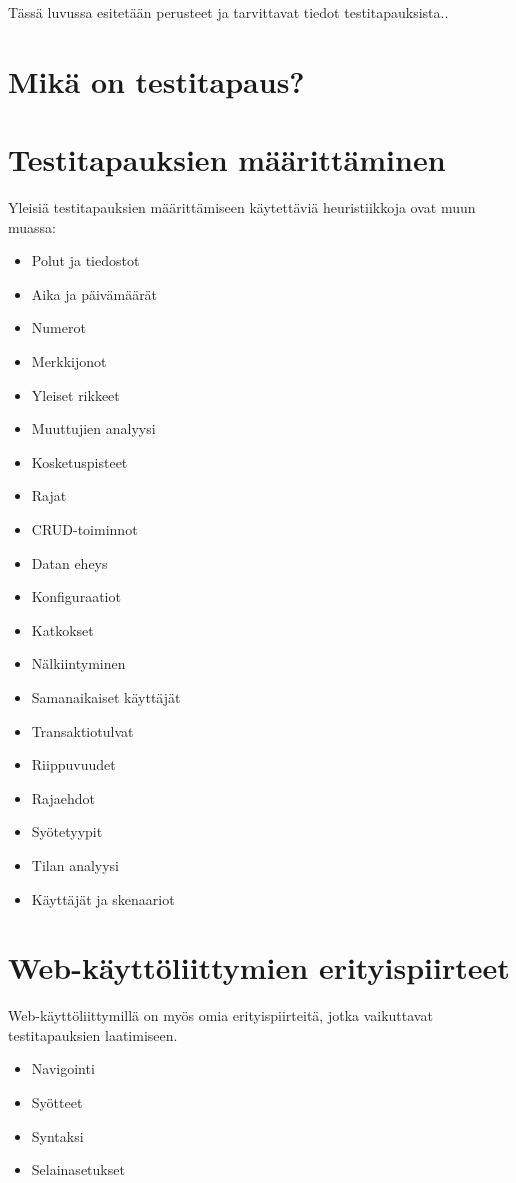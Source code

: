 Tässä luvussa esitetään perusteet ja tarvittavat tiedot testitapauksista..

\section{Mikä on testitapaus?}


\section{Testitapauksien määrittäminen}

Yleisiä testitapauksien määrittämiseen käytettäviä heuristiikkoja ovat muun muassa:
\begin{itemize}
  \item Polut ja tiedostot
  \item Aika ja päivämäärät
  \item Numerot
  \item Merkkijonot
  \item Yleiset rikkeet
  \item Muuttujien analyysi
  \item Kosketuspisteet
  \item Rajat
  \item CRUD-toiminnot
  \item Datan eheys
  \item Konfiguraatiot
  \item Katkokset
  \item Nälkiintyminen
  \item Samanaikaiset käyttäjät
  \item Transaktiotulvat
  \item Riippuvuudet
  \item Rajaehdot
  \item Syötetyypit
  \item Tilan analyysi
  \item Käyttäjät ja skenaariot
\end{itemize}

\section{Web-käyttöliittymien erityispiirteet}

Web-käyttöliittymillä on myös omia erityispiirteitä, jotka vaikuttavat testitapauksien laatimiseen.
\begin{itemize}
  \item Navigointi
  \item Syötteet
  \item Syntaksi
  \item Selainasetukset
\end{itemize}

